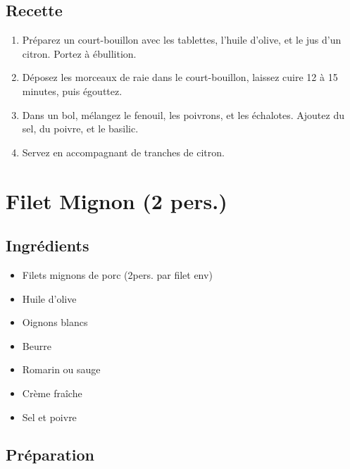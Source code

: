 \subsection{Recette}\label{recette-4}

\begin{enumerate}
\def\labelenumi{\arabic{enumi}.}

\item
  Préparez un court-bouillon avec les tablettes, l'huile d'olive, et le
  jus d'un citron. Portez à ébullition.
\item
  Déposez les morceaux de raie dans le court-bouillon, laissez cuire 12
  à 15 minutes, puis égouttez.
\item
  Dans un bol, mélangez le fenouil, les poivrons, et les échalotes.
  Ajoutez du sel, du poivre, et le basilic.
\item
  Servez en accompagnant de tranches de citron.
\end{enumerate}

\section{Filet Mignon (2 pers.)}\label{filet-mignon-2-pers.}

\subsection{Ingrédients}\label{ingruxe9dients-6}

\begin{itemize}

\item
  Filets mignons de porc (2pers. par filet env)
\item
  Huile d'olive
\item
  Oignons blancs
\item
  Beurre
\item
  Romarin ou sauge
\item
  Crème fraîche
\item
  Sel et poivre
\end{itemize}

\subsection{Préparation}\label{pruxe9paration-2}

